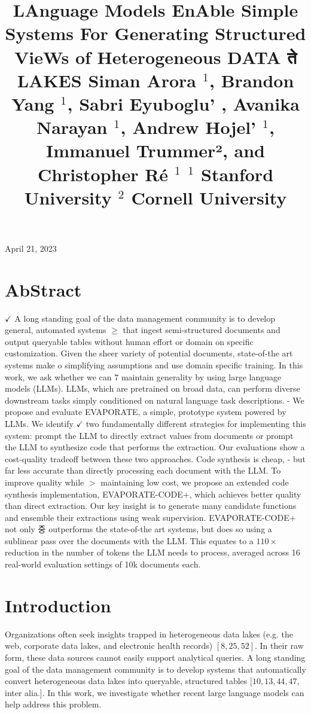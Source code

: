 \documentclass[10pt]{article}
\title{LAnguage Models EnAble Simple Systems For Generating Structured VieWs of Heterogeneous DATA ते LAKES Siman Arora ${ }^{1}$, Brandon Yang ${ }^{1}$, Sabri Eyuboglu' , Avanika Narayan ${ }^{1}$, Andrew Hojel' ${ }^{1}$, Immanuel Trummer², and Christopher Ré ${ }^{1}$ 
 ${ }^{1}$ Stanford University 
 ${ }^{2}$ Cornell University }
\author{}
\date{}
\begin{document}
\maketitle
April 21, 2023

\section{AbStract}
$\checkmark$ A long standing goal of the data management community is to develop general, automated systems $\geqslant$ that ingest semi-structured documents and output queryable tables without human effort or domain on specific customization. Given the sheer variety of potential documents, state-of-the art systems make o simplifying assumptions and use domain specific training. In this work, we ask whether we can 7 maintain generality by using large language models (LLMs). LLMs, which are pretrained on broad data, can perform diverse downstream tasks simply conditioned on natural language task descriptions. - We propose and evaluate EVAPORATE, a simple, prototype system powered by LLMs. We identify $\checkmark$ two fundamentally different strategies for implementing this system: prompt the LLM to directly extract values from documents or prompt the LLM to synthesize code that performs the extraction. Our evaluations show a cost-quality tradeoff between these two approaches. Code synthesis is cheap, - but far less accurate than directly processing each document with the LLM. To improve quality while $>$ maintaining low cost, we propose an extended code synthesis implementation, EVAPORATE-CODE+, which achieves better quality than direct extraction. Our key insight is to generate many candidate functions and ensemble their extractions using weak supervision. EVAPORATE-CODE+ not only 중 outperforms the state-of-the art systems, but does so using a sublinear pass over the documents with the LLM. This equates to a $110 \times$ reduction in the number of tokens the LLM needs to process, averaged across 16 real-world evaluation settings of 10k documents each.

\section{Introduction}
Organizations often seek insights trapped in heterogeneous data lakes (e.g. the web, corporate data lakes, and electronic health records) $[8,25,52]$. In their raw form, these data sources cannot easily support analytical queries. A long standing goal of the data management community is to develop systems that automatically convert heterogeneous data lakes into queryable, structured tables $[10,13,44,47$, inter alia.]. In this work, we investigate whether recent large language models can help address this problem.
\end{document}
